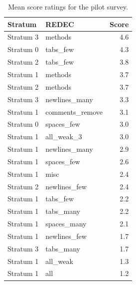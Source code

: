 \documentclass[%
class=scrreprt,
chapterprefix=false,%
open=right,%
twoside=false,%
paper=a4,%
logofile={Logo\_zentral\_farbig\_EN.png},%
thesistype=master,%
UKenglish,%
]{se2thesis}
\theoremstyle{definition}
\newcommand{\rdh}{REDEC\xspace}
\begin{document}
	
	\begin{table}[tb]
		\centering
		\caption{Mean score ratings for the pilot survey.}
		\vspace{8pt}
		\label{tab:pilot_survey_results}
		\begin{tabular}{llr}
			\toprule
			Stratum & \rdh & Score \\
			\midrule
			Stratum 3 & methods & 4.6 \\
			Stratum 0 & tabs\_few & 4.3 \\
			Stratum 2 & tabs\_few & 3.8 \\
			Stratum 1 & methods & 3.7 \\
			Stratum 2 & methods & 3.7 \\
			Stratum 3 & newlines\_many & 3.3 \\
			Stratum 1 & comments\_remove & 3.1 \\
			Stratum 0 & spaces\_few & 3.0 \\
			Stratum 1 & all\_weak\_3 & 3.0 \\
			Stratum 1 & newlines\_many & 2.9 \\
			Stratum 1 & spaces\_few & 2.6 \\
			Stratum 1 & misc & 2.4 \\
			Stratum 2 & newlines\_few & 2.4 \\
			Stratum 1 & tabs\_few & 2.2 \\
			Stratum 1 & tabs\_many & 2.2 \\
			Stratum 1 & spaces\_many & 2.1 \\
			Stratum 1 & newlines\_few & 1.7 \\
			Stratum 3 & tabs\_many & 1.7 \\
			Stratum 1 & all\_weak & 1.3 \\
			Stratum 1 & all & 1.2 \\
			\bottomrule
		\end{tabular}
	\end{table}
	
\end{document}
